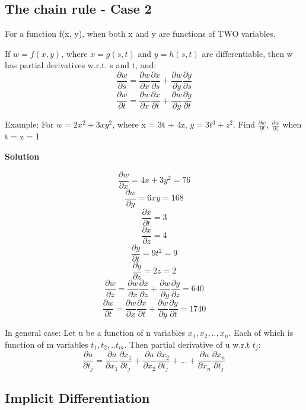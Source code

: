 \documentclass[12pt]{article}
\begin{document}
\subsection{The chain rule - Case 2}
For a function f(x, y), when both x and y are functions of TWO
variables.\\
\begin{mybox}
    If $w = f(x, y)$, where $x = g(s, t)$ and $y = h(s, t)$ are differentiable, then w has partial derivatives w.r.t. s and t, and:
    $$\frac{\partial w}{\partial s} = \frac{\partial w}{\partial x}\frac{\partial x}{\partial s}+\frac{\partial w}{\partial y}\frac{\partial y}{\partial s}$$
    $$\frac{\partial w}{\partial t} = \frac{\partial w}{\partial x}\frac{\partial x}{\partial t}+\frac{\partial w}{\partial y}\frac{\partial y}{\partial t}$$
\end{mybox}
Example: For $w = 2x^2 + 3xy^2$, where x = 3t + 4z, $y = 3t^3 +z^2$. Find $\frac{\partial w}{\partial t}$, $\frac{\partial w}{\partial z}$ when t = z = 1
 \begin{center}
     \textbf{Solution}
 \end{center}
$$\frac{\partial w}{\partial x} = 4x + 3y^2 = 76 $$
$$\frac{\partial w}{\partial y} = 6xy = 168$$
$$\frac{\partial x}{\partial t}= 3$$
$$\frac{\partial x}{\partial z}= 4$$
$$\frac{\partial y}{\partial t} = 9t^2 = 9$$
$$\frac{\partial y}{\partial z}= 2z = 2$$
$$\frac{\partial w}{\partial z} = \frac{\partial w}{\partial x}\frac{\partial x}{\partial z}+\frac{\partial w}{\partial y}\frac{\partial y}{\partial z} =  640$$
$$\frac{\partial w}{\partial t} = \frac{\partial w}{\partial x}\frac{\partial x}{\partial t}+\frac{\partial w}{\partial y}\frac{\partial y}{\partial t} = 1740$$



\begin{mybox}
    In general case: Let u be a function of n variables $x_1, x_2,.., x_n$. Each of which is function of m variables $t_1, t_2,..t_m$. Then partial derivative of u w.r.t $t_j$:
    $$\frac{\partial u}{\partial t_j}= \frac{\partial u}{\partial x_1}\frac{\partial x_1}{\partial t_j}+\frac{\partial u}{\partial x_2}\frac{\partial x_2}{\partial t_j}+...+\frac{\partial u}{\partial x_n}\frac{\partial x_n}{\partial t_j}$$
\end{mybox} 
\subsection{Implicit Differentiation}
\end{document}
